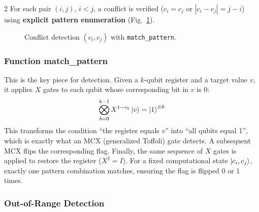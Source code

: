 \documentclass[9pt, a4paper]{extarticle}
\begin{document}
\begin{multicols}{2}
For each pair $(i, j)$, $i < j$, a conflict is verified ($c_i = c_j$ or $|c_i - c_j| = j - i$) using \textbf{explicit pattern enumeration} (Fig.~\ref{fig:conflict}).

\begin{figure}[H]
    \centering
    \caption{Conflict detection $(c_i, c_j)$ with \texttt{match\_pattern}.}
    \label{fig:conflict}
\end{figure}

\subsubsection{Function match\_pattern}

This is the key piece for detection. Given a $k$-qubit register and a target value $v$, it applies $X$ gates to each qubit whose corresponding bit in $v$ is 0:
\begin{equation}
    \bigotimes_{b=0}^{k-1} X^{1-v_b} \ket{v} = \ket{1}^{\otimes k}
\end{equation}
This transforms the condition ``the register equals $v$'' into ``all qubits equal 1'', which is exactly what an MCX (generalized Toffoli) gate detects. A subsequent MCX flips the corresponding flag. Finally, the same sequence of $X$ gates is applied to restore the register ($X^2 = I$).
For a fixed computational state $\ket{c_i, c_j}$, exactly one pattern combination matches, ensuring the flag is flipped 0 or 1 times.

\subsubsection{Out-of-Range Detection}


\end{multicols}
\end{document}
